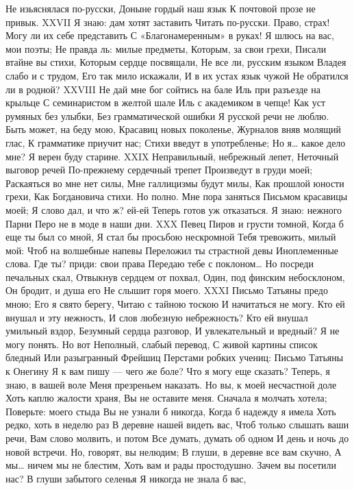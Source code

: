 Не изьяснялася по-русски,
Доныне гордый наш язык
К почтовой прозе не привык.
XXVII
Я знаю: дам хотят заставить
Читать по-русски. Право, страх!
Могу ли их себе представить
С «Благонамеренным» в руках!
Я шлюсь на вас, мои поэты;
Не правда ль: милые предметы,
Которым, за свои грехи,
Писали втайне вы стихи,
Которым сердце посвящали,
Не все ли, русским языком
Владея слабо и с трудом,
Его так мило искажали,
И в их устах язык чужой
Не обратился ли в родной?
XXVIII
Не дай мне бог сойтись на бале
Иль при разъезде на крыльце
С семинаристом в желтой шале
Иль с академиком в чепце!
Как уст румяных без улыбки,
Без грамматической ошибки
Я русской речи не люблю.
Быть может, на беду мою,
Красавиц новых поколенье,
Журналов вняв молящий глас,
К грамматике приучит нас;
Стихи введут в употребленье;
Но я… какое дело мне?
Я верен буду старине.
XXIX
Неправильный, небрежный лепет,
Неточный выговор речей
По-прежнему сердечный трепет
Произведут в груди моей;
Раскаяться во мне нет силы,
Мне галлицизмы будут милы,
Как прошлой юности грехи,
Как Богдановича стихи.
Но полно. Мне пора заняться
Письмом красавицы моей;
Я слово дал, и что ж? ей-ей
Теперь готов уж отказаться.
Я знаю: нежного Парни
Перо не в моде в наши дни.
XXX
Певец Пиров и грусти томной,
Когда б еще ты был со мной,
Я стал бы просьбою нескромной
Тебя тревожить, милый мой:
Чтоб на волшебные напевы
Переложил ты страстной девы
Иноплеменные слова.
Где ты? приди: свои права
Передаю тебе с поклоном…
Но посреди печальных скал,
Отвыкнув сердцем от похвал,
Один, под финским небосклоном,
Он бродит, и душа его
Не слышит горя моего.
XXXI
Письмо Татьяны предо мною;
Его я свято берегу,
Читаю с тайною тоскою
И начитаться не могу.
Кто ей внушал и эту нежность,
И слов любезную небрежность?
Кто ей внушал умильный вздор,
Безумный сердца разговор,
И увлекательный и вредный?
Я не могу понять. Но вот
Неполный, слабый перевод,
С живой картины список бледный
Или разыгранный Фрейшиц
Перстами робких учениц:
Письмо Татьяны к Онегину
Я к вам пишу — чего же боле?
Что я могу еще сказать?
Теперь, я знаю, в вашей воле
Меня презреньем наказать.
Но вы, к моей несчастной доле
Хоть каплю жалости храня,
Вы не оставите меня.
Сначала я молчать хотела;
Поверьте: моего стыда
Вы не узнали б никогда,
Когда б надежду я имела
Хоть редко, хоть в неделю раз
В деревне нашей видеть вас,
Чтоб только слышать ваши речи,
Вам слово молвить, и потом
Все думать, думать об одном
И день и ночь до новой встречи.
Но, говорят, вы нелюдим;
В глуши, в деревне все вам скучно,
А мы… ничем мы не блестим,
Хоть вам и рады простодушно.
Зачем вы посетили нас?
В глуши забытого селенья
Я никогда не знала б вас,
